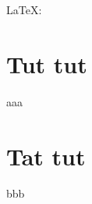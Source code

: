 LaTeX: \documentclass{article}
\begin{document}
\section{Tut tut}

aaa





\section{Tat tut}

bbb
\end{document}
